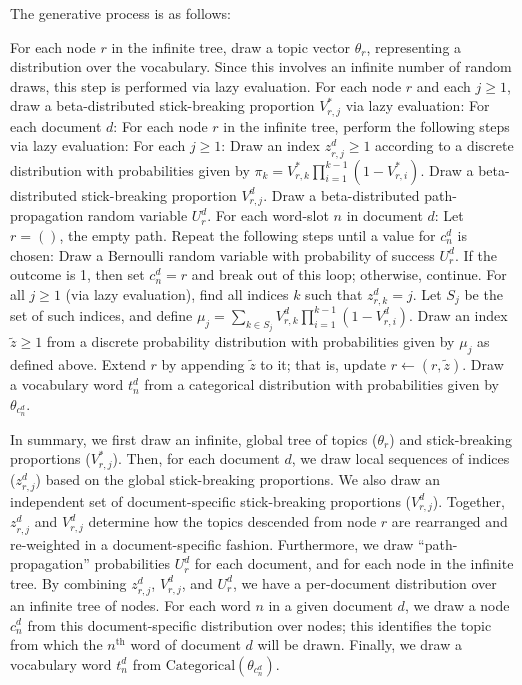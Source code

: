 \documentclass{article}
\newcommand{\nth}{^{\text{th}}}
\begin{document}
The generative process is as follows:
\begin{outline}[enumerate]
\1 For each node $r$ in the infinite tree, draw a topic vector $\theta_r$, representing a distribution over the vocabulary.
Since this involves an infinite number of random draws, this step is performed via lazy evaluation.
\1 For each node $r$ and each $j \geq 1$, draw a beta-distributed stick-breaking proportion $V^*_{r,j}$ via lazy evaluation:
\1 For each document $d$:
  \2 For each node $r$ in the infinite tree, perform the following steps via lazy evaluation:
    \3 For each $j \geq 1$:
      \4 Draw an index $z^d_{r,j} \geq 1$ according to a discrete distribution with probabilities given by $\pi_k = V^*_{r,k} \prod_{i=1}^{k-1} (1-V^*_{r,i})$.
      \4 Draw a beta-distributed stick-breaking proportion $V^d_{r,j}$.
    \3 Draw a beta-distributed path-propagation random variable $U^d_r$.
  \2 For each word-slot $n$ in document $d$:
    \3 Let $r = ()$, the empty path.
    \3 Repeat the following steps until a value for $c^d_n$ is chosen:
      \4 Draw a Bernoulli random variable with probability of success $U^d_r$.
      \4 If the outcome is 1, then set $c^d_n = r$ and break out of this loop; otherwise, continue.
      \4 For all $j \geq 1$ (via lazy evaluation), find all indices $k$ such that $z^d_{r,k} = j$.  Let $S_j$ be the set of such indices, and define $\mu_j = \sum_{k \in S_j} V^d_{r,k} \prod_{i=1}^{k-1} (1-V^d_{r,i})$.
      \4 Draw an index $\tilde z \geq 1$ from a discrete probability distribution with probabilities given by $\mu_j$ as defined above.
      \4 Extend $r$ by appending $\tilde z$ to it; that is, update $r \gets (r, \tilde z)$.
    \3 Draw a vocabulary word $t^d_n$ from a categorical distribution with probabilities given by $\theta_{c^d_n}$.
\end{outline}

In summary, we first draw an infinite, global tree of topics ($\theta_r$) and stick-breaking proportions ($V^*_{r,j}$).
Then, for each document $d$, we draw local sequences of indices ($z^d_{r,j}$) based on the global stick-breaking proportions.
We also draw an independent set of document-specific stick-breaking proportions ($V^d_{r,j}$).
Together, $z^d_{r,j}$ and $V^d_{r,j}$ determine how the topics descended from node $r$ are rearranged and re-weighted in a document-specific fashion.
Furthermore, we draw ``path-propagation'' probabilities $U^d_r$ for each document, and for each node in the infinite tree.
By combining $z^d_{r,j}$, $V^d_{r,j}$, and $U^d_r$, we have a per-document distribution over an infinite tree of nodes.
For each word $n$ in a given document $d$, we draw a node $c^d_n$ from this document-specific distribution over nodes;
this identifies the topic from which the $n\nth$ word of document $d$ will be drawn.
Finally, we draw a vocabulary word $t^d_n$ from ${\text{Categorical}(\theta_{c^d_n})}$.
\end{document}
